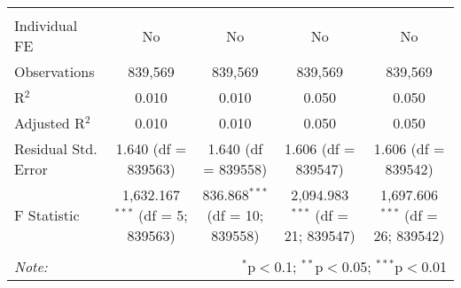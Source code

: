 \documentclass[
]{article}
\begin{document}
\begin{table}[!htbp]
{\begin{tabular}{@{\extracolsep{5pt}}lcccc}
\hline \\[-1.8ex] 
Individual FE & No & No & No & No \\ 
Observations & 839,569 & 839,569 & 839,569 & 839,569 \\ 
R$^{2}$ & 0.010 & 0.010 & 0.050 & 0.050 \\ 
Adjusted R$^{2}$ & 0.010 & 0.010 & 0.050 & 0.050 \\ 
Residual Std. Error & 1.640 (df = 839563) & 1.640 (df = 839558) & 1.606 (df = 839547) & 1.606 (df = 839542) \\ 
F Statistic & 1,632.167$^{***}$ (df = 5; 839563) & 836.868$^{***}$ (df = 10; 839558) & 2,094.983$^{***}$ (df = 21; 839547) & 1,697.606$^{***}$ (df = 26; 839542) \\ 
\hline 
\hline \\[-1.8ex] 
\textit{Note:}  & \multicolumn{4}{r}{$^{*}$p$<$0.1; $^{**}$p$<$0.05; $^{***}$p$<$0.01} \\ 
\end{tabular}
} 
\end{table} 
\newpage
\end{document}
